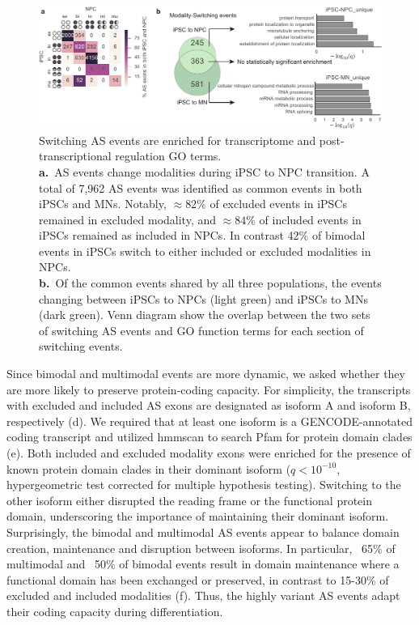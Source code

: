 \begin{figure}[h]
  \centering
  \includegraphics[width=5.8in]{figures/dynamic_modalities_supplementary.pdf}
  \caption[Switching AS events are enriched for transcriptome and post-transcriptional regulation GO terms.]{
  Switching AS events are enriched for transcriptome and post-transcriptional regulation GO terms.\\
\textbf{a.}~AS events change modalities during iPSC to NPC transition. A total of 7,962 AS events was identified as common events in both iPSCs and MNs. Notably, $\approx 82\%$ of excluded events in iPSCs remained in excluded modality, and $\approx 84\%$ of included events in iPSCs remained as included in NPCs. In contrast 42\% of bimodal events in iPSCs switch to either included or excluded modalities in NPCs.\\
\textbf{b.}~Of the common events shared by all three populations, the events changing between iPSCs to NPCs (light green) and iPSCs to MNs (dark green). Venn diagram show the overlap between the two sets of switching AS events and GO function terms for each section of switching events.\\
}
\label{fig:switching_modalities}
\end{figure}


Since bimodal and multimodal events are more dynamic, we asked whether they are more likely to preserve protein-coding capacity. For simplicity, the transcripts with excluded and included AS exons are designated as isoform A and isoform B, respectively (d). We required that at least one isoform is a GENCODE-annotated coding transcript and utilized  hmmscan \cite{Eddy:1998ut,Finn:2011eg} to search Pfam \cite{Finn:2016bf,Bateman2004-paperpile} for protein domain clades (e). Both included and excluded modality exons were enriched for the presence of known protein domain clades in their dominant isoform ($q < 10^{-10}$, hypergeometric test corrected for multiple hypothesis testing). Switching to the other isoform either disrupted the reading frame or the functional protein domain, underscoring the importance of maintaining their dominant isoform. Surprisingly, the bimodal and multimodal AS events appear to balance domain creation, maintenance and disruption between isoforms. In particular, ~65\% of multimodal and ~50\% of bimodal events result in domain maintenance where a functional domain has been exchanged or preserved, in contrast to 15-30\% of excluded and included modalities (f). Thus, the highly variant AS events adapt their coding capacity during differentiation.

